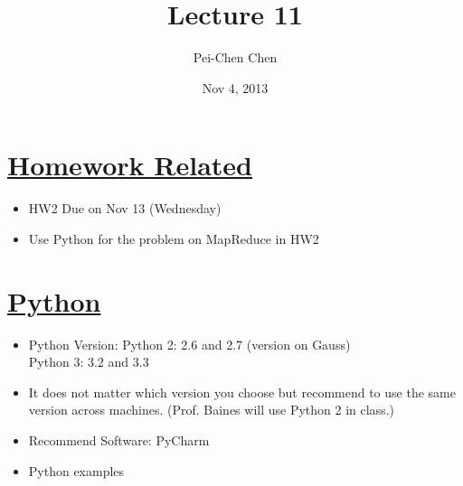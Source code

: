 \documentclass[11pt, oneside]{article}   	%
\title{Lecture 11}
\author{Pei-Chen Chen}
\date{Nov 4, 2013}							%
\begin{document}
\maketitle
\section{\underline{Homework Related}}
\begin{itemize}
\item HW2 Due on Nov 13 (Wednesday)
\item Use Python for the problem on MapReduce in HW2 
\end{itemize}
\section{\underline{Python}}
\begin{itemize}
\item Python Version: Python 2: 2.6 and 2.7 (version on Gauss) \\
Python 3: 3.2 and 3.3 \\
\item It does not matter which version you choose but recommend to use the same version across machines. (Prof. Baines will use Python 2 in class.)
\item Recommend Software: PyCharm
\item Python examples 
\end{itemize}
\end{document}

